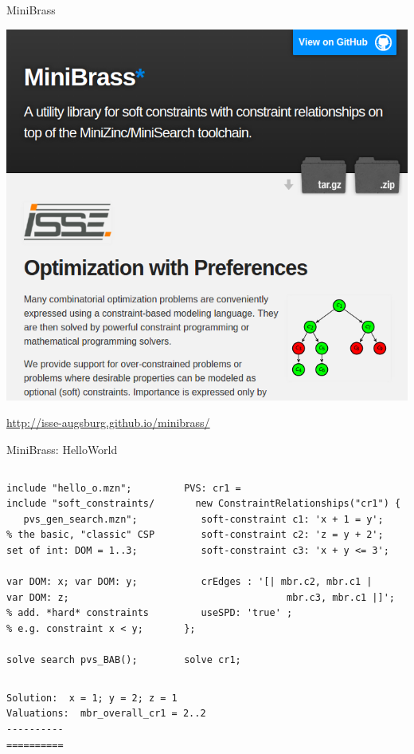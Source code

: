 \documentclass[handout,10pt,xcolor={dvipsnames},fleqn]{beamer}
\begin{document}
\begin{frame}[fragile]{MiniBrass}

\begin{center}

\includegraphics[width=.5\textwidth]{img/minibrass.png}

\vspace*{2ex}

\url{http://isse-augsburg.github.io/minibrass/}

\end{center}

\end{frame}

\begin{frame}[fragile]{MiniBrass: HelloWorld}
\begin{columns}[onlytextwidth,T]
    
    \begin{column}{.40\textwidth}
          
    \begin{lstlisting}
include "hello_o.mzn"; 
include "soft_constraints/
   pvs_gen_search.mzn"; 
% the basic, "classic" CSP 
set of int: DOM = 1..3;

var DOM: x; var DOM: y; 
var DOM: z;
% add. *hard* constraints
% e.g. constraint x < y;

solve search pvs_BAB();
\end{lstlisting}
    \end{column}
    
    \begin{column}{.55\textwidth}
  	\begin{lstlisting}
PVS: cr1 = 
  new ConstraintRelationships("cr1") {
   soft-constraint c1: 'x + 1 = y';
   soft-constraint c2: 'z = y + 2';
   soft-constraint c3: 'x + y <= 3';
   
   crEdges : '[| mbr.c2, mbr.c1 | 
                  mbr.c3, mbr.c1 |]';
   useSPD: 'true' ;
}; 

solve cr1;
\end{lstlisting}

    \end{column}
  \end{columns}
  \pause
  \begin{verbatim}
Solution:  x = 1; y = 2; z = 1
Valuations:  mbr_overall_cr1 = 2..2
----------
==========
  \end{verbatim}
\end{frame}
\end{document}
